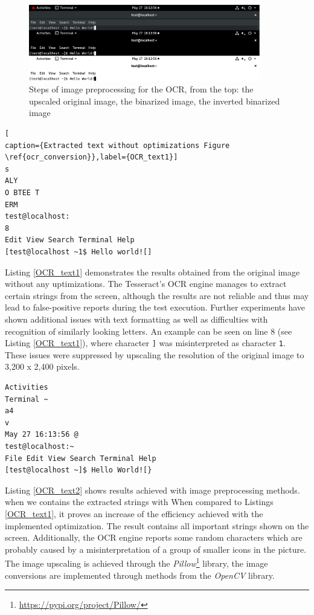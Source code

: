 \begin{figure}[H]
	\centering
	\includegraphics[width=0.9\textwidth,clip]{obrazky-figures/OCR_conversion.png}
	\caption{Steps of image preprocessing for the OCR, from the top: the upscaled original image, the binarized image, the inverted binarized image}
	\label{ocr_conversion}
\end{figure}

\begin{lstlisting}[
caption={Extracted text without optimizations Figure \ref{ocr_conversion}},label={OCR_text1}]
s
ALY
O BTEE T
ERM
test@localhost:
8
Edit View Search Terminal Help
[test@localhost ~1$ Hello world![]
\end{lstlisting}

Listing \ref{OCR_text1} demonstrates the results obtained from the original image without any uptimizations. The Tesseract's OCR engine manages to extract certain strings from the screen, although the results are not reliable and thus may lead to false-positive reports during the test execution. Further experiments have shown additional issues with text formatting as well as difficulties with recognition of similarly looking letters. An example can be seen on line 8 (see Listing \ref{OCR_text1}), where character \texttt{]} was misinterpreted as character \texttt{1}. These issues were suppressed by upscaling the resolution of the original image to 3,200 x 2,400 pixels.

\begin{lstlisting}[caption={Extracted text with optimizations},label={OCR_text2}]
Activities
Terminal ~
a4
v
May 27 16:13:56 @
test@localhost:~
File Edit View Search Terminal Help
[test@localhost ~]$ Hello World![}
\end{lstlisting}

Listing \ref{OCR_text2} shows results achieved with image preprocessing methods. when we  contains the extracted strings with  When compared to Listings \ref{OCR_text1}, it proves an increase of the efficiency achieved with the implemented optimization. The result contains all important strings shown on the screen. Additionally, the OCR engine reports some random characters which are probably caused by a misinterpretation of a group of smaller icons in the picture. The image upscaling is achieved through the \textit{Pillow}\footnote{\url{https://pypi.org/project/Pillow/}} library, the image conversions are implemented through methods from the \textit{OpenCV} library. 

